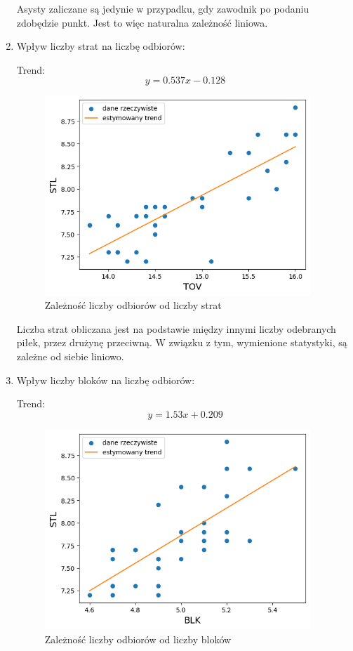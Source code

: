 \documentclass{article}
\begin{document}
\begin{enumerate}
        Asysty zaliczane są jedynie w przypadku, gdy zawodnik po podaniu zdobędzie punkt. Jest to więc naturalna zależność liniowa.
\newpage         
        \item Wpływ liczby strat na liczbę odbiorów:
        
        
        Trend:\begin{equation} y = 0.537x - 0.128 \end{equation}
        
            \begin{figure}[H]
                \centering
                \includegraphics[width=10cm]{wykres_zaleznosci_STL_od_TOV.png}
                \caption{Zależność liczby odbiorów od liczby strat}
                \label{fig:wykres_zaleznosci_STL_od_TOV}
            \end{figure}


        Liczba strat obliczana jest na podstawie między innymi liczby odebranych piłek, przez drużynę przeciwną. W związku z tym, wymienione statystyki, są zależne od siebie liniowo.
\newpage 
        \item Wpływ liczby bloków na liczbę odbiorów:
        
        
        Trend:\begin{equation} y = 1.53x + 0.209 \end{equation}
        
            \begin{figure}[H]
                \centering
                \includegraphics[width=10cm]{wykres_zaleznosci_STL_od_BLK.png}
                \caption{Zależność liczby odbiorów od liczby bloków}
                \label{fig:wykres_zaleznosci_STL_od_BLK.png}
            \end{figure}



\end{enumerate}
\end{document}
